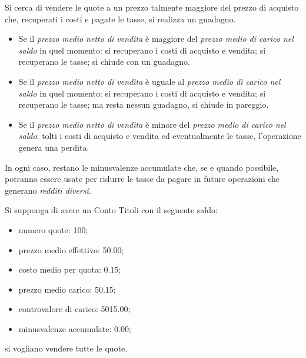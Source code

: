 \documentclass[12pt,a4paper]{article}
\newcommand{\Eur}[1]{\SI{#1}{\text{\euro{}}}}
\begin{document}
Si cerca  di vendere le quote  a un prezzo  talmente maggiore del prezzo  di acquisto
che, recuperati i costi e pagate le tasse, si realizza un guadagno.
\begin{itemize}
\item Se il \emph{prezzo medio netto di vendita} è maggiore del \emph{prezzo medio di
     carico nel saldo} in quel momento: si  recuperano i costi di acquisto e vendita;
  si recuperano le tasse; si chiude con un guadagno.

\item Se il  \emph{prezzo medio netto di  vendita} è uguale al  \emph{prezzo medio di
     carico nel saldo} in quel momento: si  recuperano i costi di acquisto e vendita;
  si recuperano le tasse; ma resta nessun guadagno, si chiude in pareggio.

\item Se il \emph{prezzo  medio netto di vendita} è minore  del \emph{prezzo medio di
     carico  nel saldo}:  tolti i  costi di  acquisto e  vendita ed  eventualmente le
  tasse, l'operazione genera una perdita.
\end{itemize}
In ogni caso, restano le minusvalenze accumulate che, se e quando possibile, potranno
essere  usate per  ridurre  le tasse  da  pagare in  future  operazioni che  generano
\emph{redditi diversi}.

Si supponga di avere un Conto Titoli con il seguente saldo:
\begin{itemize}
\item numero quote: \num{100};
\item prezzo medio effettivo: \Eur{50,00};
\item costo medio per quota: \Eur{0,15};
\item prezzo medio carico: \Eur{50,15};
\item controvalore di carico: \Eur{5015,00};
\item minusvalenze accumulate: \Eur{0,00};
\end{itemize}
si vogliano vendere tutte le quote.

\end{document}
